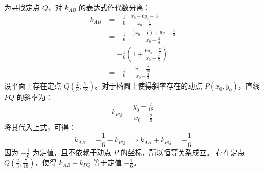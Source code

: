 \begin{solution}
为寻找定点 $Q$，对 $k_{AB}$ 的表达式作代数分离：
\begin{align*}
k_{AB} &= -\frac{1}{6} \cdot \frac{x_0 + 6y_0 - 3}{x_0 - \frac{2}{3}} \\
&= -\frac{1}{6} \cdot \frac{\left(x_0 - \frac{2}{3}\right) + 6y_0 - \frac{7}{3}}{x_0 - \frac{2}{3}} \\
&= -\frac{1}{6} \left( 1 + \frac{6y_0 - \frac{7}{3}}{x_0 - \frac{2}{3}} \right) \\
&= -\frac{1}{6} - \frac{y_0 - \frac{7}{18}}{x_0 - \frac{2}{3}}
\end{align*}
设平面上存在定点 $Q\left(\frac{2}{3}, \frac{7}{18}\right)$。对于椭圆上使得斜率存在的动点 $P(x_0, y_0)$，直线 $PQ$ 的斜率为：
\[ k_{PQ} = \frac{y_0 - \frac{7}{18}}{x_0 - \frac{2}{3}} \]
将其代入上式，可得：
\[ k_{AB} = -\frac{1}{6} - k_{PQ} \implies k_{AB} + k_{PQ} = -\frac{1}{6} \]
因为 $-\frac{1}{6}$ 为定值，且不依赖于动点 $P$ 的坐标，所以恒等关系成立。
存在定点 $Q\left(\frac{2}{3}, \frac{7}{18}\right)$，使得 $k_{AB} + k_{PQ}$ 等于定值 $-\frac{1}{6}$。
\end{solution}



